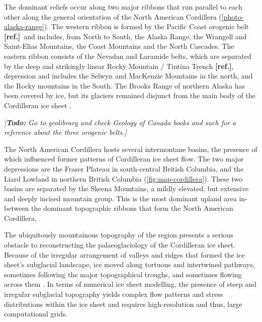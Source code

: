 \documentclass{article}
\newcommand{\todo}[1]{\emph{[\textbf{Todo:} #1]}}
\newcommand{\mref}[0]{\textbf{[ref.]}}
\begin{document}
The dominant reliefs occur along two major ribbons that run
parallel to each other along the general orientation of the North American Cordillera
(\cref{photo-alaska-range}). The western ribbon is formed by the Pacific Coast
orogenic belt \mref\ and includes,
from North to South, the Alaska Range, the Wrangell and Saint-Elias Mountains,
the Coast Mountains and the North Cascades. The eastern ribbon consists of the
Nevadan and Laramide belts, which are separated by the deep and strikingly
linear Rocky Mountain / Tintina Trench \mref, depression and includes the Selwyn and
MacKenzie Mountains in the north, and the Rocky mountains in the South. The
Brooks Range of northern Alaska has been covered by ice, but its glaciers
remained disjunct from the main body of the Cordilleran ice sheet
\citep{Kaufman.Manley.2004}.

\todo{Go to geolibrary and check \emph{Geology of Canada} books and such for a
      reference about the three orogenic belts.}

The North American Cordillera hosts several intermontane basins, the presence
of which influenced former patterns of Cordilleran ice sheet flow. The two
major depressions are the Fraser Plateau in south-central British Columbia, and
the Liard Lowland in northern British Columbia (\cref{fig:map-cordillera}).
These two basins are separated by the Skeena Mountains, a mildly elevated, but
extensive and deeply incised mountain group. This is the most dominant upland
area in-between the dominant topographic ribbons that form the North American
Cordillera.

The ubiquitously mountainous topography of the region presents a serious
obstacle to reconstructing the palaeoglaciology of the Cordilleran ice sheet.
Because of the irregular arrangement of valleys and ridges that formed the ice
sheet's subglacial landscape, ice moved along tortuous and intertwined
pathways, sometimes following the major topographical troughs, and sometimes
flowing across them \citep{Davis.Mathews.1944, Kleman.etal.2010}. In terms of
numerical ice sheet modelling, the presence of steep and irregular subglacial
topography yields complex flow patterns and stress distributions within the ice
sheet and requires high-resolution and thus, large computational grids.
\end{document}

